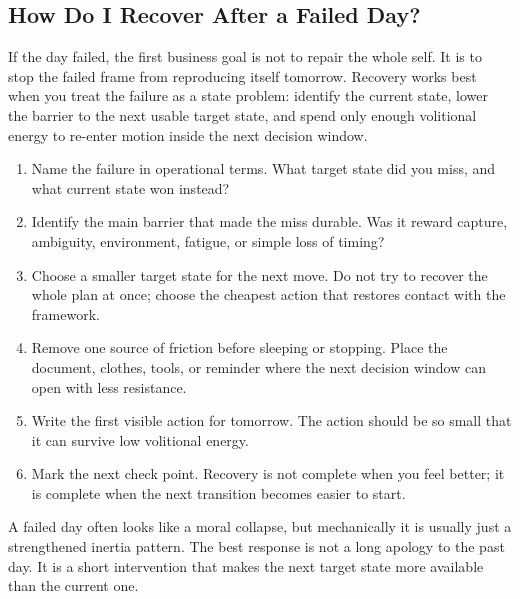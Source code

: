 \subsection{How Do I Recover After a Failed Day?}

If the day failed, the first business goal is not to repair the whole self. It
is to stop the failed frame from reproducing itself tomorrow. Recovery works
best when you treat the failure as a state problem: identify the current state,
lower the barrier to the next usable target state, and spend only enough
volitional energy to re-enter motion inside the next decision window.

\begin{enumerate}[nosep]
  \item Name the failure in operational terms. What target state did you miss,
        and what current state won instead?
  \item Identify the main barrier that made the miss durable. Was it reward
        capture, ambiguity, environment, fatigue, or simple loss of timing?
  \item Choose a smaller target state for the next move. Do not try to recover
        the whole plan at once; choose the cheapest action that restores
        contact with the framework.
  \item Remove one source of friction before sleeping or stopping. Place the
        document, clothes, tools, or reminder where the next decision window
        can open with less resistance.
  \item Write the first visible action for tomorrow. The action should be so
        small that it can survive low volitional energy.
  \item Mark the next check point. Recovery is not complete when you feel
        better; it is complete when the next transition becomes easier to
        start.
\end{enumerate}

\begin{remark}
A failed day often looks like a moral collapse, but mechanically it is usually
just a strengthened inertia pattern. The best response is not a long apology to
the past day. It is a short intervention that makes the next target state more
available than the current one.
\end{remark}
